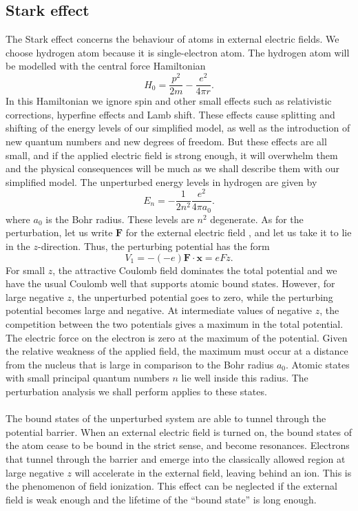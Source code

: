 \subsection{Stark effect}
The Stark effect concerns the behaviour of atoms in external electric fields. We choose hydrogen atom because it is single-electron atom.
The hydrogen atom will be modelled with the central force Hamiltonian
\[H_0 = \frac{p^2}{2m} - \frac{e^2}{4\pi r}.\]
In this Hamiltonian we ignore spin and other small effects such as relativistic corrections, hyperfine effects and Lamb shift. These effects cause splitting and shifting of the energy levels of our simplified model, as well as the introduction of new quantum numbers and new degrees of freedom.
But these effects are all small, and if the applied electric field is strong enough, it will overwhelm them and the physical consequences will be much as we shall describe them with our simplified model.
The unperturbed energy levels in hydrogen are given by
\[E_n = -\frac{1}{2n^2} \frac{e^2}{4\pi a_0}.\]
where $a_0$ is the Bohr radius. These levels are $n^2$ degenerate.
As for the perturbation, let us write $\bm{F}$ for the external electric field , and let us take it to lie in the $z$-direction. Thus, the perturbing potential has the form
\[V_1 = -(-e)\bm{F}\cdot\bm{x} = eFz.\]
For small $z$, the attractive Coulomb field dominates the total potential and we have the usual Coulomb well that supports atomic bound states. However, for large negative $z$, the unperturbed potential goes to zero, while the perturbing
potential becomes large and negative. At intermediate values of negative $z$, the competition between the two potentials gives a maximum in the total potential. The electric force on the electron is zero at the maximum of the potential. 
Given the relative weakness of the applied field, the maximum must occur at a distance from the nucleus that is large in comparison to the Bohr radius $a_0$. Atomic states with small principal quantum numbers $n$ lie well inside this radius. The perturbation analysis we shall perform applies to these states.
\\ \\
The bound states of the unperturbed system are able to tunnel through the potential barrier. When an external electric field is turned on, the bound states of the atom cease to be bound in the strict sense, and become resonances. 
Electrons that tunnel through the barrier and emerge into the classically allowed region at large negative $z$ will accelerate in the external field, leaving behind an ion. This is the phenomenon of field ionization. This effect can be neglected if the external field is weak enough and the lifetime of the ``bound state'' is long enough.
